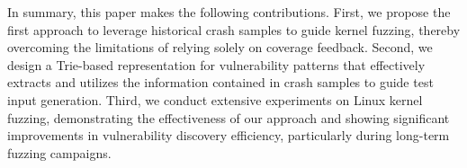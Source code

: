 In summary, this paper makes the following contributions. First, we propose the first approach to leverage historical crash samples to guide kernel fuzzing, thereby overcoming the limitations of relying solely on coverage feedback. Second, we design a Trie-based representation for vulnerability patterns that effectively extracts and utilizes the information contained in crash samples to guide test input generation. Third, we conduct extensive experiments on Linux kernel fuzzing, demonstrating the effectiveness of our approach and showing significant improvements in vulnerability discovery efficiency, particularly during long-term fuzzing campaigns.